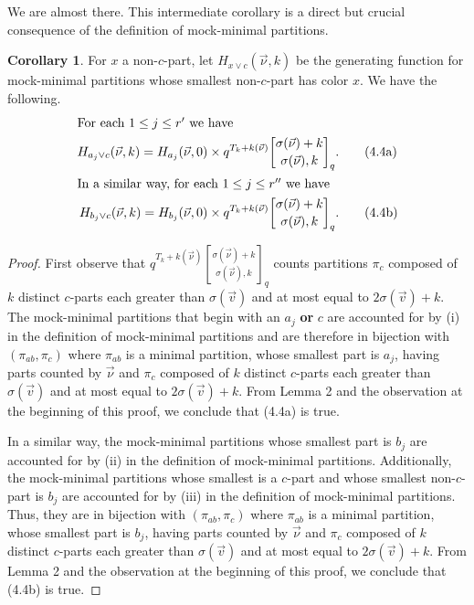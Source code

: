\documentclass[12pt,a4paper]{amsart}
\theoremstyle{definition}
\theoremstyle{notation}
\theoremstyle{corollary}
\newtheorem{corollary}{Corollary}
\begin{document}
We are almost there. This intermediate corollary is a direct but crucial consequence of the definition of mock-minimal partitions.

\begin{corollary}
For $x$ a non-$c$-part, let $H_{x\lor c}(\vec{\nu},k)$ be the generating function for mock-minimal partitions whose smallest non-$c$-part has color $x$. We have the following.  
\begin{align*}
\intertext{For each $1\leq j\leq r'$ we have}
    H_{a_j\lor c}(\vec{\nu},k)=H_{a_j}(\vec{\nu},0)& \times q^{T_{k}+k(\vec{\nu})}{\sigma(\vec{\nu})+k\brack \sigma(\vec{\nu}),k}_{q}.\tag{4.4a}\\
\intertext{In a similar way, for each $1\leq j\leq r''$ we have}    
    H_{b_j\lor c}(\vec{\nu},k)=H_{b_j}(\vec{\nu},0)&\times q^{T_{k}+k(\vec{\nu})}{\sigma(\vec{\nu})+k\brack \sigma(\vec{\nu}),k}_{q}.\tag{4.4b}\\
\end{align*}
\end{corollary}
\begin{proof}
First observe that $q^{T_{k}+k(\vec{\nu})}{\sigma(\vec{\nu})+k\brack \sigma(\vec{\nu}),k}_{q}$ counts partitions $\pi_c$ composed of $k$ distinct $c$-parts each greater than $\sigma(\vec{v})$ and at most equal to $2\sigma(\vec{v})+k$. The mock-minimal partitions that begin with an $a_j$ \textbf{or} $c$ are accounted for by (i) in the definition of mock-minimal partitions and are therefore in bijection with $(\pi_{ab},\pi_c)$ where $\pi_{ab}$ is a minimal partition, whose smallest part is $a_j$, having parts counted by $\vec{\nu}$ and $\pi_c$ composed of $k$ distinct $c$-parts each greater than $\sigma(\vec{v})$ and at most equal to $2\sigma(\vec{v})+k$. From Lemma 2 and the observation at the beginning of this proof, we conclude that (4.4a) is true. 

In a similar way, the mock-minimal partitions whose smallest part is $b_j$ are accounted for by (ii) in the definition of mock-minimal partitions. Additionally, the mock-minimal partitions whose smallest is a $c$-part and whose smallest non-$c$-part is $b_j$ are accounted for by (iii) in the definition of mock-minimal partitions. Thus, they are in bijection with $(\pi_{ab},\pi_c)$ where $\pi_{ab}$ is a minimal partition, whose smallest part is $b_j$, having parts counted by $\vec{\nu}$ and $\pi_c$ composed of $k$ distinct $c$-parts each greater than $\sigma(\vec{v})$ and at most equal to $2\sigma(\vec{v})+k$. From Lemma 2 and the observation at the beginning of this proof, we conclude that (4.4b) is true. 
\end{proof}
\end{document}
